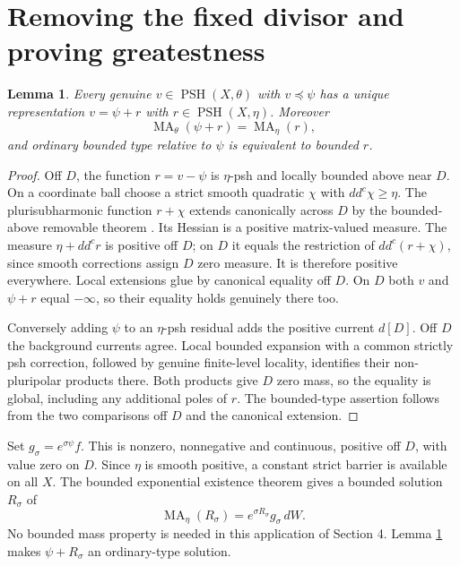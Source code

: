 \documentclass[11pt]{article}
\newcommand{\ddc}{dd^c}
\newcommand{\PSH}{\operatorname{PSH}}
\newcommand{\MA}{\operatorname{MA}}
\newtheorem{lemma}[theorem]{Lemma}
\theoremstyle{remark}\newtheorem{remark}[theorem]{Remark}
\begin{document}
\section{Removing the fixed divisor and proving greatestness}

\begin{lemma}\label{lem:removal}
Every genuine $v\in\PSH(X,\theta)$ with $v\preceq\psi$ has a unique representation $v=\psi+r$ with
$r\in\PSH(X,\eta)$. Moreover
\[
 \MA_\theta(\psi+r)=\MA_\eta(r),
\]
and ordinary bounded type relative to $\psi$ is equivalent to bounded $r$.
\end{lemma}
\begin{proof}
Off $D$, the function $r=v-\psi$ is $\eta$-psh and locally bounded above
near $D$. On a coordinate ball choose a strict smooth quadratic $\chi$
with $\ddc\chi\geq\eta$. The plurisubharmonic function $r+\chi$ extends
canonically across $D$ by the bounded-above removable theorem
\cite[I, Theorem 5.24]{Demailly}. Its Hessian is a positive matrix-valued
measure. The measure $\eta+\ddc r$ is positive off $D$; on $D$ it equals
the restriction of $\ddc(r+\chi)$, since smooth corrections assign $D$
zero measure. It is therefore positive everywhere. Local extensions glue
by canonical equality off $D$. On $D$ both $v$ and $\psi+r$ equal $-\infty$,
so their equality holds genuinely there too.

Conversely adding $\psi$ to an $\eta$-psh residual adds the positive current
$d[D]$. Off $D$ the background currents agree. Local bounded expansion with
a common strictly psh correction, followed by genuine finite-level locality,
identifies their non-pluripolar products there. Both products give $D$ zero
mass, so the equality is global, including any additional poles of $r$.
The bounded-type assertion follows from the two comparisons off $D$ and
the canonical extension.
\end{proof}

Set $g_\sigma=e^{\sigma\psi}f$. This is nonzero, nonnegative and continuous,
positive off $D$, with value zero on $D$. Since $\eta$ is smooth positive,
a constant strict barrier is available on all $X$. The bounded exponential
existence theorem \cite[Theorem 4.5]{BGL} gives a bounded solution $R_\sigma$
of
\[
 \MA_\eta(R_\sigma)=e^{\sigma R_\sigma}g_\sigma\,dW.
\]
No bounded mass property is needed in this application of Section 4.
Lemma \ref{lem:removal} makes $\psi+R_\sigma$ an ordinary-type solution.
\end{document}
